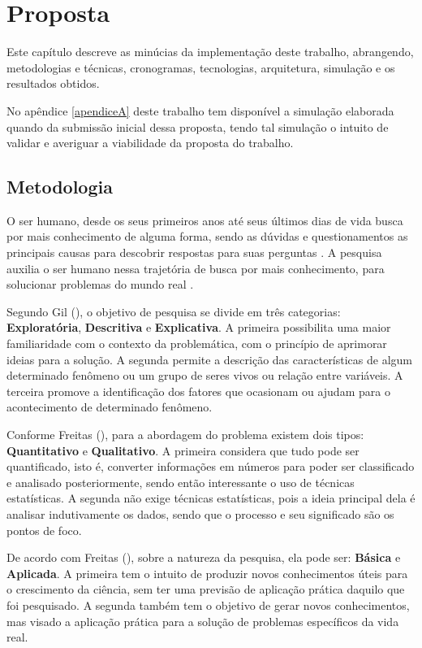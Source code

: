\chapter{Proposta}
\label{proposta}

Este capítulo descreve as minúcias da implementação deste trabalho, abrangendo, metodologias e técnicas, cronogramas, tecnologias, arquitetura, simulação e os resultados obtidos.

No apêndice \ref{apendiceA} deste trabalho tem disponível a simulação elaborada quando da submissão inicial dessa proposta, tendo tal simulação o intuito de validar e averiguar a viabilidade da proposta do trabalho.

\section{Metodologia}
\label{metodologia}

O ser humano, desde os seus primeiros anos até seus últimos dias de vida busca por mais conhecimento de alguma forma, sendo as dúvidas e questionamentos as principais causas para descobrir respostas para suas perguntas \cite{Paschoarelli_Medola_Bonfim_2018}. A pesquisa auxilia o ser humano nessa trajetória de busca por mais conhecimento, para solucionar problemas do mundo real \cite{gil:2008}.

Segundo Gil (\citeyear{gil:2002}), o objetivo de pesquisa se divide em três categorias: \textbf{Exploratória}, \textbf{Descritiva} e \textbf{Explicativa}. A primeira possibilita uma maior familiaridade com o contexto da problemática, com o princípio de aprimorar ideias para a solução. A segunda permite a descrição das características de algum determinado fenômeno ou um grupo de seres vivos ou relação entre variáveis. A terceira promove a identificação dos fatores que ocasionam ou ajudam para o acontecimento de determinado fenômeno.

Conforme Freitas (\citeyear{de2013metodologia}), para a abordagem do problema existem dois tipos: \textbf{Quantitativo} e \textbf{Qualitativo}. A primeira considera que tudo pode ser quantificado, isto é, converter informações em números para poder ser classificado e analisado posteriormente, sendo então interessante o uso de técnicas estatísticas. A segunda não exige técnicas estatísticas, pois a ideia principal dela é analisar indutivamente os dados, sendo que o processo e seu significado são os pontos de foco.

De acordo com Freitas (\citeyear{de2013metodologia}), sobre a natureza da pesquisa, ela pode ser: \textbf{Básica} e \textbf{Aplicada}. A primeira tem o intuito de produzir novos conhecimentos úteis para o crescimento da ciência, sem ter uma previsão de aplicação prática daquilo que foi pesquisado. A segunda também tem o objetivo de gerar novos conhecimentos, mas visado a aplicação prática para a solução de problemas específicos da vida real.

